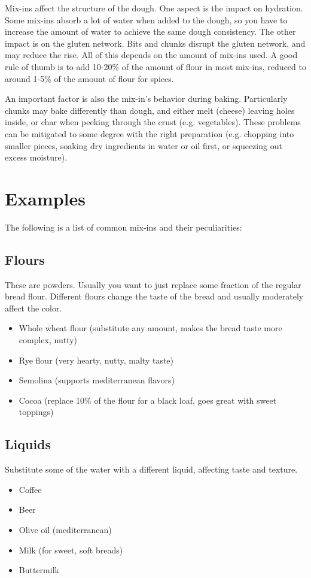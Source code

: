 Mix-ins affect the structure of the dough. One aspect is the impact on
hydration. Some mix-ins absorb a lot of water when added to the dough, so you
have to increase the amount of water to achieve the same dough consistency.
The other impact is on the gluten network. Bits and chunks disrupt the gluten
network, and may reduce the rise. All of this depends on the amount of mix-ins
used. A good rule of thumb is to add 10-20\% of the amount of flour in most
mix-ins, reduced to around 1-5\% of the amount of flour for spices.

An important factor is also the mix-in's behavior during baking. Particularly
chunks may bake differently than dough, and either melt (cheese) leaving holes
inside, or char when peeking through the crust (e.g. vegetables). These
problems can be mitigated to some degree with the right preparation (e.g.
chopping into smaller pieces, soaking dry ingredients in water or oil first,
or squeezing out excess moisture).

\section{Examples}

The following is a list of common mix-ins and their peculiarities:

\subsection{Flours}
These are powders. Usually you want to just replace some fraction of the
regular bread flour. Different flours change the taste of the bread and
usually moderately affect the color.
\begin{itemize}
  \item Whole wheat flour (substitute any amount, makes the bread taste more
      complex, nutty)
  \item Rye flour (very hearty, nutty, malty taste)
  \item Semolina (supports mediterranean flavors)
  \item Cocoa (replace 10\% of the flour for a black loaf, goes great with
      sweet toppings)
\end{itemize}

\subsection{Liquids}
Substitute some of the water with a different liquid, affecting taste and
texture.
\begin{itemize}
  \item Coffee
  \item Beer
  \item Olive oil (mediterranean)
  \item Milk (for sweet, soft breads)
  \item Buttermilk
\end{itemize}

